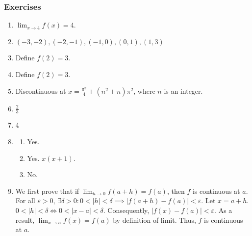 \documentclass{article}
\begin{document}
\subsubsection*{Exercises}
\begin{enumerate}
  \item $\lim_{x\to4}f(x)=4$.
        \setcounter{enumi}{3}
  \item $(-3, -2), (-2, -1), (-1, 0), (0, 1), (1, 3)$
        \setcounter{enumi}{22}
  \item Define $f(2) = 3$.
  \item Define $f(2) = 3$.
        \setcounter{enumi}{33}
  \item Discontinuous at $x = \frac{\pi^2}{4} + \left(n^2+n\right)\pi^2$, where $n$ is an
        integer.
        \setcounter{enumi}{44}
  \item $\frac{2}{3}$
        \setcounter{enumi}{46}
  \item 4
        \setcounter{enumi}{48}
  \item \begin{enumerate}
          \item Yes.
          \item Yes. $x(x+1)$.
          \item No.
        \end{enumerate}
        \setcounter{enumi}{62}
  \item We first prove that if $\lim_{h\to0}f(a+h)=f(a)$, then $f$ is continuous at $a$. For all
        $\varepsilon>0$, $\exists\delta>0: 0<|h|<\delta\implies|f(a+h)-f(a)|<\varepsilon$. Let
        $x=a+h$. $0<|h|<\delta \iff 0<|x-a|<\delta$. Consequently, $|f(x)-f(a)|<\varepsilon$.
        As a result, $\lim_{x \to a}f(x) = f(a)$ by definition of limit. Thus, $f$ is continuous
        at $a$.


\end{enumerate}
\end{document}
